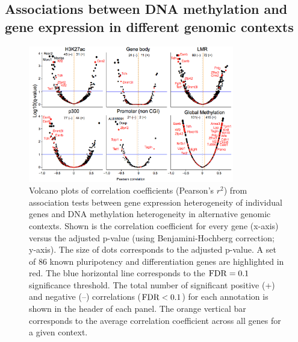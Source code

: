 \subsection{Associations between DNA methylation and gene expression in different genomic contexts} \label{sec:mt_results}

\begin{figure}[htbp!]
\centering
\includegraphics[width=0.8\textwidth]{gene_volcano}
\caption[Volcano plots of correlation coefficients.]{Volcano plots of correlation coefficients (Pearson's $r^2$) from association tests between gene expression heterogeneity of individual genes and DNA methylation heterogeneity in alternative genomic contexts. Shown is the correlation coefficient for every gene (x-axis) versus the adjusted p-value (using Benjamini-Hochberg correction; y-axis). The size of dots corresponds to the adjusted p-value. A set of 86 known pluripotency and differentiation genes are highlighted in red. The blue horizontal line corresponds to the $\operatorname{FDR}=0.1$ significance threshold. The total number of significant positive (+) and negative (–) correlations ($\operatorname{FDR}<0.1$) for each annotation is shown in the header of each panel. The orange vertical bar corresponds to the average correlation coefficient across all genes for a given context.}
\label{fig:mt_gene_volcano}
\end{figure}

